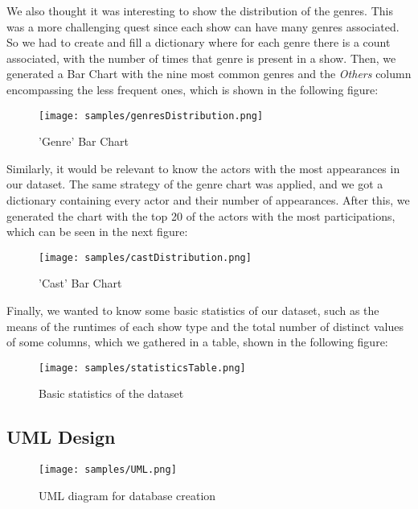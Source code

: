 \documentclass[sigplan,screen]{acmart}
\begin{document}
\newpage

We also thought it was interesting to show the distribution of the genres. This was a more challenging quest since each show can have many genres associated. So we had to create and fill a dictionary where for each genre there is a count associated, with the number of times that genre is present in a show. Then, we generated a Bar Chart with the nine most common genres and the \emph{Others} column encompassing the less frequent ones, which is shown in the following figure:

\begin{figure}[h]
  \centering
  \texttt{[image: samples/genresDistribution.png]}
  \caption{'Genre' Bar Chart}
\end{figure}

Similarly, it would be relevant to know the actors with the most appearances in our dataset. The same strategy of the genre chart was applied, and we got a dictionary containing every actor and their number of appearances. After this, we generated the chart with the top 20 of the actors with the most participations, which can be seen in the next figure:

\begin{figure}[h]
  \centering
  \texttt{[image: samples/castDistribution.png]}
  \caption{'Cast' Bar Chart}
\end{figure}

Finally, we wanted to know some basic statistics of our dataset, such as the means of the runtimes of each show type and the total number of distinct values of some columns, which we gathered in a table, shown in the following figure:
\newpage

\begin{figure}[h]
  \centering
  \texttt{[image: samples/statisticsTable.png]}
  \caption{Basic statistics of the dataset}
\end{figure}

\subsection{UML Design}

\begin{figure}[h]
  \centering
  \texttt{[image: samples/UML.png]}
  \caption{UML diagram for database creation}
\end{figure}
\end{document}
